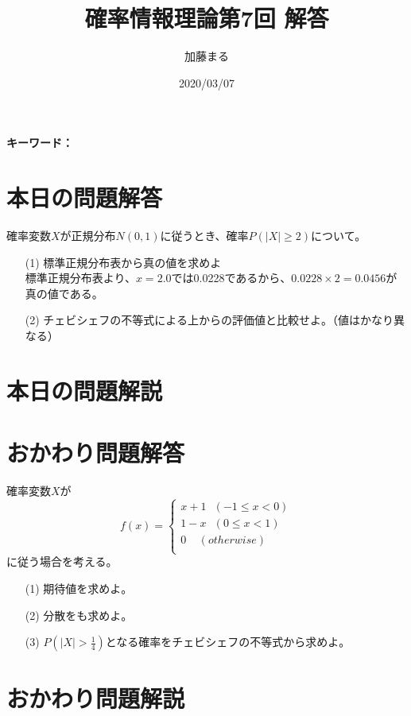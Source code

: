 \documentclass[a4j,uplatex]{jsarticle}
\title{確率情報理論第7回 解答}
\author{加藤まる}
\date{2020/03/07}
\begin{document}
\maketitle
\bf キーワード：
\rm

\section*{本日の問題解答}
確率変数$X$が正規分布$N(0,1)$に従うとき、確率$P(|X|\ge2)$について。
\begin{itemize}
  \item[(1)] 標準正規分布表から真の値を求めよ\\
    標準正規分布表より、$x=2.0$では0.0228であるから、$0.0228\times 2=0.0456$が真の値である。
  \item[(2)] チェビシェフの不等式による上からの評価値と比較せよ。（値はかなり異なる） \\
    
\end{itemize}


\section*{本日の問題解説}

\section*{おかわり問題解答}
確率変数$X$が
\begin{equation}
  f(x)=
 \begin{cases}
   x+1~~~(-1\le x<0)\\
   1-x~~~(0\le x<1)\\
   0~~~~~(otherwise)\\
 \end{cases}
\end{equation}
に従う場合を考える。
\begin{itemize}
  \item[(1)] 期待値を求めよ。
  \item[(2)] 分散をも求めよ。
  \item[(3)] $P(|X|>\frac{1}{4})$となる確率をチェビシェフの不等式から求めよ。\\
\end{itemize}

\section*{おかわり問題解説}
\end{document}
